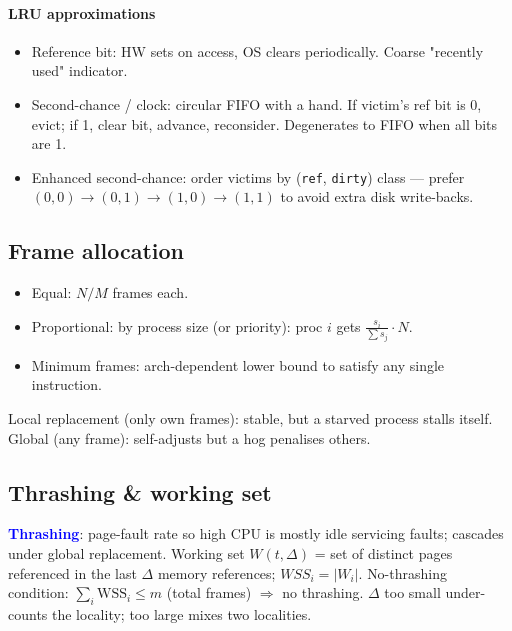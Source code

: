 \paragraph{LRU approximations}
\begin{itemize}
  \item \textcolor{Bittersweet}{Reference bit}: HW sets on access, OS clears periodically. Coarse "recently used" indicator.
  \item \textcolor{Bittersweet}{Second-chance / clock}: circular FIFO with a hand. If victim's ref bit is 0, evict; if 1, clear bit, advance, reconsider. Degenerates to FIFO when all bits are 1.
  \item \textcolor{Bittersweet}{Enhanced second-chance}: order victims by (\texttt{ref}, \texttt{dirty}) class — prefer $(0,0) \to (0,1) \to (1,0) \to (1,1)$ to avoid extra disk write-backs.
\end{itemize}

\subsection{Frame allocation}
\begin{itemize}
  \item \textcolor{Bittersweet}{Equal}: $N/M$ frames each.
  \item \textcolor{Bittersweet}{Proportional}: by process size (or priority): proc $i$ gets $\frac{s_i}{\sum s_j}\cdot N$.
  \item \textcolor{Bittersweet}{Minimum frames}: arch-dependent lower bound to satisfy any single instruction.
\end{itemize}
\textcolor{Bittersweet}{Local} replacement (only own frames): stable, but a starved process stalls itself. \textcolor{Bittersweet}{Global} (any frame): self-adjusts but a hog penalises others.

\subsection{Thrashing \& working set}
\textcolor{Blue}{\textbf{Thrashing}}: page-fault rate so high CPU is mostly idle servicing faults; cascades under global replacement.
\textcolor{Bittersweet}{Working set} $W(t,\Delta)$ = set of distinct pages referenced in the last $\Delta$ memory references; $WSS_i=|W_i|$.
\textcolor{Bittersweet}{No-thrashing condition}: $\sum_i \text{WSS}_i \le m$ (total frames) $\Rightarrow$ no thrashing.
$\Delta$ too small under-counts the locality; too large mixes two localities.


